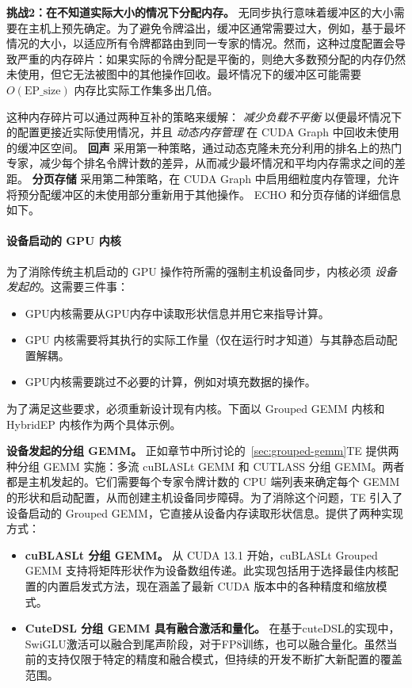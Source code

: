 \textbf{挑战2：在不知道实际大小的情况下分配内存。}
无同步执行意味着缓冲区的大小需要在主机上预先确定。为了避免令牌溢出，缓冲区通常需要过大，例如，基于最坏情况的大小，以适应所有令牌都路由到同一专家的情况。然而，这种过度配置会导致严重的内存碎片：如果实际的令牌分配是平衡的，则绝大多数预分配的内存仍然未使用，但它无法被图中的其他操作回收。最坏情况下的缓冲区可能需要 $O(\text{EP\_size})$ 内存比实际工作集多出几倍。

这种内存碎片可以通过两种互补的策略来缓解： \emph{减少负载不平衡} 以便最坏情况下的配置更接近实际使用情况，并且 \emph{动态内存管理} 在 CUDA Graph 中回收未使用的缓冲区空间。 \textbf{回声} 采用第一种策略，通过动态克隆未充分利用的排名上的热门专家，减少每个排名令牌计数的差异，从而减少最坏情况和平均内存需求之间的差距。 \textbf{分页存储} 采用第二种策略，在 CUDA Graph 中启用细粒度内存管理，允许将预分配缓冲区的未使用部分重新用于其他操作。 ECHO 和分页存储的详细信息如下。

\paragraph{设备启动的 GPU 内核}
\label{sec:device-init}

为了消除传统主机启动的 GPU 操作符所需的强制主机设备同步，内核必须 \emph{设备发起的}。这需要三件事：
\begin{itemize}
\item[i.] GPU内核需要从GPU内存中读取形状信息并用它来指导计算。
\item[ii.] GPU 内核需要将其执行的实际工作量（仅在运行时才知道）与其静态启动配置解耦。
\item[iii.] GPU内核需要跳过不必要的计算，例如对填充数据的操作。
\end{itemize}
为了满足这些要求，必须重新设计现有内核。下面以 Grouped GEMM 内核和 HybridEP 内核作为两个具体示例。

\textbf{设备发起的分组 GEMM。}
正如章节中所讨论的~\ref{sec:grouped-gemm}TE 提供两种分组 GEMM 实施：多流 cuBLASLt GEMM 和 CUTLASS 分组 GEMM。两者都是主机发起的。它们需要每个专家令牌计数的 CPU 端列表来确定每个 GEMM 的形状和启动配置，从而创建主机设备同步障碍。为了消除这个问题，TE 引入了设备启动的 Grouped GEMM，它直接从设备内存读取形状信息。提供了两种实现方式：

\begin{itemize}
\item[i.] \textbf{cuBLASLt 分组 GEMM。}
从 CUDA 13.1 开始，cuBLASLt Grouped GEMM 支持将矩阵形状作为设备数组传递。此实现包括用于选择最佳内核配置的内置启发式方法，现在涵盖了最新 CUDA 版本中的各种精度和缩放模式。

\item[ii.] \textbf{CuteDSL 分组 GEMM 具有融合激活和量化。}
在基于cuteDSL的实现中，SwiGLU激活可以融合到尾声阶段，对于FP8训练，也可以融合量化。虽然当前的支持仅限于特定的精度和融合模式，但持续的开发不断扩大新配置的覆盖范围。
\end{itemize}

